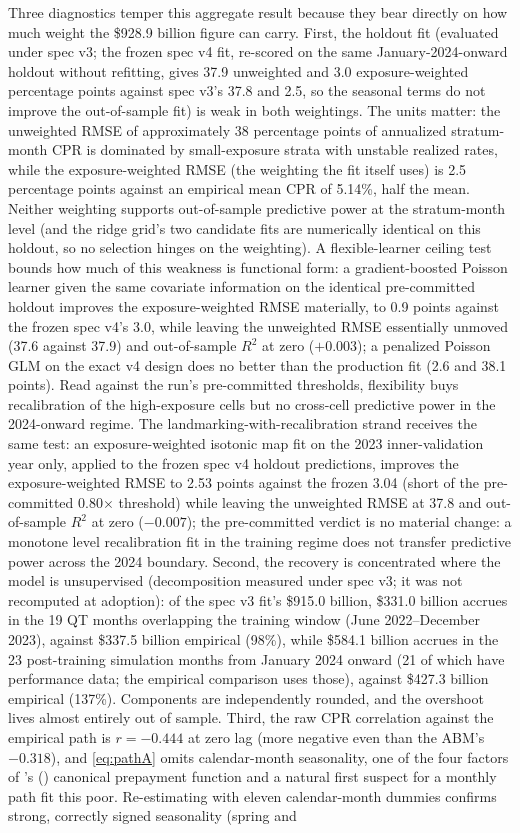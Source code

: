 \documentclass[12pt]{article}
\newcommand{\citepos}[1]{\citeauthor{#1}'s (\citeyear{#1})}
\begin{document}
Three diagnostics temper this aggregate result because they bear directly on how much weight the \$928.9 billion figure can carry. First, the holdout fit (evaluated under spec v3; the frozen spec v4 fit, re-scored on the same January-2024-onward holdout without refitting, gives 37.9 unweighted and 3.0 exposure-weighted percentage points against spec v3's 37.8 and 2.5, so the seasonal terms do not improve the out-of-sample fit) is weak in both weightings. The units matter: the unweighted RMSE of approximately 38 percentage points of annualized stratum-month CPR is dominated by small-exposure strata with unstable realized rates, while the exposure-weighted RMSE (the weighting the fit itself uses) is 2.5 percentage points against an empirical mean CPR of 5.14\%, half the mean. Neither weighting supports out-of-sample predictive power at the stratum-month level (and the ridge grid's two candidate fits are numerically identical on this holdout, so no selection hinges on the weighting). A flexible-learner ceiling test bounds how much of this weakness is functional form: a gradient-boosted Poisson learner given the same covariate information on the identical pre-committed holdout improves the exposure-weighted RMSE materially, to 0.9 points against the frozen spec v4's 3.0, while leaving the unweighted RMSE essentially unmoved (37.6 against 37.9) and out-of-sample $R^2$ at zero ($+0.003$); a penalized Poisson GLM on the exact v4 design does no better than the production fit (2.6 and 38.1 points). Read against the run's pre-committed thresholds, flexibility buys recalibration of the high-exposure cells but no cross-cell predictive power in the 2024-onward regime. The landmarking-with-recalibration strand receives the same test: an exposure-weighted isotonic map fit on the 2023 inner-validation year only, applied to the frozen spec v4 holdout predictions, improves the exposure-weighted RMSE to 2.53 points against the frozen 3.04 (short of the pre-committed 0.80$\times$ threshold) while leaving the unweighted RMSE at 37.8 and out-of-sample $R^2$ at zero ($-0.007$); the pre-committed verdict is no material change: a monotone level recalibration fit in the training regime does not transfer predictive power across the 2024 boundary. Second, the recovery is concentrated where the model is unsupervised (decomposition measured under spec v3; it was not recomputed at adoption): of the spec v3 fit's \$915.0 billion, \$331.0 billion accrues in the 19 QT months overlapping the training window (June 2022--December 2023), against \$337.5 billion empirical (98\%), while \$584.1 billion accrues in the 23 post-training simulation months from January 2024 onward (21 of which have performance data; the empirical comparison uses those), against \$427.3 billion empirical (137\%). Components are independently rounded, and the overshoot lives almost entirely out of sample. Third, the raw CPR correlation against the empirical path is $r = -0.444$ at zero lag (more negative even than the ABM's $-0.318$), and \eqref{eq:pathA} omits calendar-month seasonality, one of the four factors of \citepos{richard1989} canonical prepayment function and a natural first suspect for a monthly path fit this poor. Re-estimating with eleven calendar-month dummies confirms strong, correctly signed seasonality (spring and 
\end{document}
